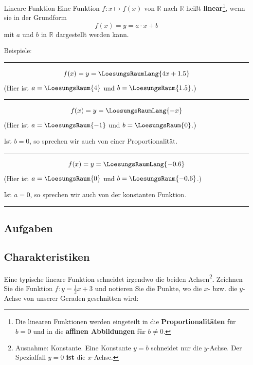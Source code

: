 \begin{definition}{Lineare Funktion}{}
  Eine Funktion $f: x\mapsto f(x)$ von $\mathbb{R}$ nach $\mathbb{R}$ heißt
\textbf{linear}\footnote{Die linearen Funktionen werden eingeteilt in die \textbf{Proportionalitäten} für $b=0$ und in die \textbf{affinen Abbildungen} für $b\ne{}0$.}, wenn sie in der Grundform
$$f(x) = y=a\cdot{}x + b$$
mit $a$ und $b$ in $\mathbb{R}$ dargestellt werden kann.
\end{definition}


Beispiele:

\vspace{3mm}
\hrule
\vspace{3mm}

$$f(x) = y = \LoesungsRaumLang{4x + 1.5}$$
(Hier ist $a=\LoesungsRaum{4}$ und $b=\LoesungsRaum{1.5}$.)

\vspace{3mm}
\hrule
\vspace{3mm}

$$f(x) = y = \LoesungsRaumLang{-x}$$
(Hier ist $a=\LoesungsRaum{-1}$ und $b=\LoesungsRaum{0}$.)

Ist $b=0$, so sprechen wir auch von einer Proportionalität.

\vspace{3mm}
\hrule
\vspace{3mm}

$$f(x) = y = \LoesungsRaumLang{-0.6}$$
(Hier ist $a=\LoesungsRaum{0}$ und $b=\LoesungsRaum{-0.6}$.)

Ist $a=0$, so sprechen wir auch von der konstanten Funktion.

\vspace{3mm}
\hrule

\subsection*{Aufgaben}



\newpage%


\subsection{Charakteristiken}
Eine typische lineare Funktion schneidet irgendwo die beiden Achsen\footnote{Ausnahme: Konstante. Eine Konstante $y=b$ schneidet nur die $y$-Achse. Der Spezialfall $y=0$ \textbf{ist} die $x$-Achse.}. Zeichnen Sie die Funktion $f: y=\frac{1}{2}x  +3$ und notieren Sie die Punkte, wo die $x$- bzw. die $y$-Achse von unserer Geraden geschnitten wird:

